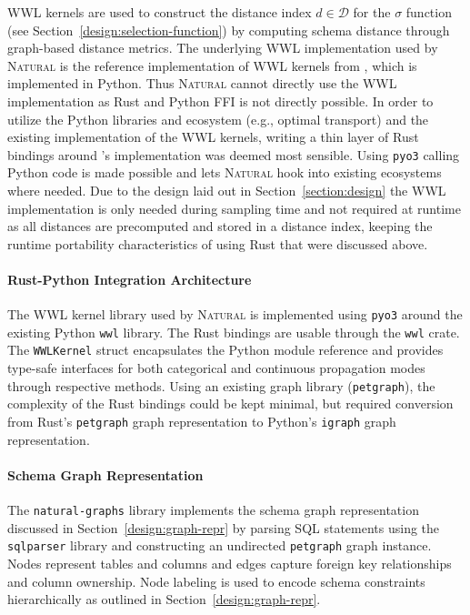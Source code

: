WWL kernels are used to construct the distance index $d \in \mathcal{D}$
for the $\sigma$ function (see Section~\ref{design:selection-function})
by computing schema distance through graph-based distance metrics. The
underlying WWL implementation used by \textsc{Natural} is the reference
implementation of WWL kernels from \citeauthor{WWL}, which is implemented in
Python. Thus \textsc{Natural} cannot directly use the WWL implementation
as Rust and Python FFI is not directly possible. In order to utilize the
Python libraries and ecosystem (e.g., optimal transport) and the existing
implementation of the WWL kernels, writing a thin layer of Rust bindings around
\citeauthor{WWL}'s implementation was deemed most sensible. Using \texttt{pyo3}
calling Python code is made possible and lets \textsc{Natural} hook into
existing ecosystems where needed. Due to the design laid out in
Section~\ref{section:design} the WWL implementation is only needed during
sampling time and not required at runtime as all distances are precomputed and
stored in a distance index, keeping the runtime portability characteristics of
using Rust that were discussed above.

\paragraph{Rust-Python Integration Architecture}

The WWL kernel library used by \textsc{Natural} is implemented using
\texttt{pyo3} around the existing Python \texttt{wwl} library. The Rust
bindings are usable through the \texttt{wwl} crate. The \texttt{WWLKernel}
struct encapsulates the Python module reference and provides type-safe interfaces for
both categorical and continuous propagation modes through respective methods.
Using an existing graph library (\texttt{petgraph}), the complexity of the Rust
bindings could be kept minimal, but required conversion from Rust's
\texttt{petgraph} graph representation to Python's \texttt{igraph} graph
representation. 

\paragraph{Schema Graph Representation}

The \texttt{natural-graphs} library implements the schema graph representation
discussed in Section~\ref{design:graph-repr} by parsing SQL statements using the
\texttt{sqlparser} library and constructing an undirected \texttt{petgraph}
graph instance. Nodes represent tables and columns and edges capture foreign
key relationships and column ownership. Node labeling is used to encode schema
constraints hierarchically as outlined in Section~\ref{design:graph-repr}.


